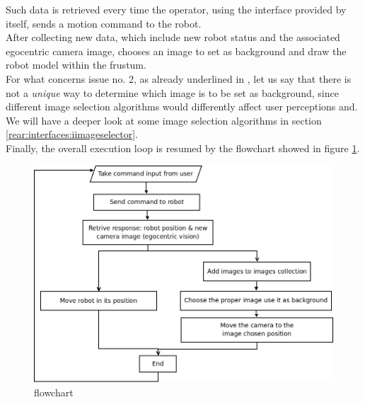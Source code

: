 Such data is retrieved every time the operator, using the 
interface provided by \framework{} itself, sends a 
motion command to the robot.
\\
After collecting new data, which include new robot status and
the associated egocentric camera image, \framework{} chooses 
an image to set as background and draw the robot model within 
the frustum.
\\
For what concerns issue no. 2, as already 
underlined in \cite{sugimoto}, let us say that there is not 
a \textit{unique} way to determine which image is to be set 
as background, since different image selection algorithms 
would differently affect user perceptions and. We will have a 
deeper look at some image selection algorithms in section
\ref{rear:interfaces:iimageselector}.
\\
Finally, the overall execution loop is resumed by the flowchart 
showed in figure \ref{fig:overall_diagram}.
\begin{figure}[!h]
  \begin{center}
    \includegraphics[width=\textwidth]{img/overall_diagram.png}
    \caption{\framework{} flowchart}
    \label{fig:overall_diagram}
  \end{center}
\end{figure}

\clearpage

\clearpage

\clearpage


